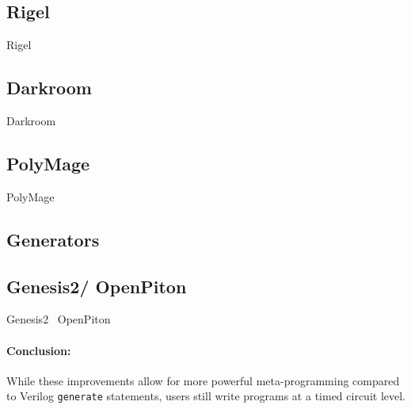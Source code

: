 \subsection{Rigel}
Rigel~\cite{hegarty_2016_rigel}
%

\subsection{Darkroom}
Darkroom~\cite{darkroom}
%

\subsection{PolyMage}
PolyMage~\cite{mullapudi_asplos_2015_polymage}


\subsection{Generators}

\subsection{Genesis2/ OpenPiton}
Genesis2~\cite{genesis2}
%
OpenPiton~\cite{balkind_asplos_2016_openpiton}

\paragraph{Conclusion: } While these improvements allow for more powerful meta-programming compared to Verilog \texttt{\small{generate}} statements, users still write programs at a timed circuit level.

